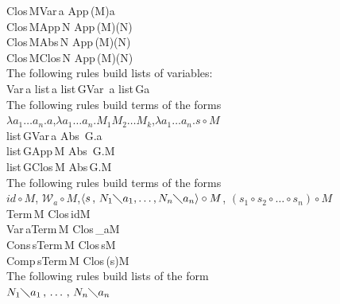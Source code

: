 \documentclass[11pt]{amsart}
\def\ruleone#1#2{\prooftree #1 \justifies #2 \endprooftree}
\def\ruletwo#1#2#3{\ruleone{#1\quad #2}{#3}}
\theoremstyle{plain}
\theoremstyle{definition}
\theoremstyle{remark}
\numberwithin{equation}{section}
\newcommand{\ci}{\circ}
\newcommand{\mi}{\,,\,}
\newcommand{\is}{\diagdown}
\newcommand{\la}{\langle}
\newcommand{\ra}{\rangle}
\newcommand{\term}{Term\,}
\newcommand{\var}{Var\,}
\newcommand{\absterm}{Abs\,}
\newcommand{\appterm}{App\,}
\newcommand{\closterm}{Clos\,}
\newcommand{\compsub}{Comp\,}
\newcommand{\conssub}{Cons\,}
\newcommand{\varlist}{list\,}
\renewcommand{\pi}{\mathcal{W}}
\begin{document}
\ruletwo{\closterm  M}{\var a}{\appterm  (M)a}\\[5pt]

\ruletwo{\closterm  M}{\appterm  N}{\appterm  (M)(N)}\\[5pt]

\ruletwo{\closterm  M}{\absterm  N}{\appterm  (M)(N)}\\[5pt]

\ruletwo{\closterm  M}{\closterm  N}{\appterm  (M)(N)}\\[5pt]


The following rules build lists of variables:\\[5pt]

\ruleone{\var a}{\varlist a}\qquad\ruletwo{\varlist G}{\var
a}{\varlist Ga}\\[5pt]


The following rules build terms of the forms\\[1pt]
$\lambda a_1\ldots a_n.a$,\quad $\lambda a_1\ldots
a_n.M_1M_2\ldots
M_k$,\quad  $\lambda a_1\ldots a_n.s\ci M$\\[5pt]

\ruletwo{\varlist G}{\var a}{\absterm  \lambda
G.a}\\[5pt]

\ruletwo{\varlist  G}{\appterm  M}{\absterm \lambda
G.M}\\[5pt]

\ruletwo{\varlist  G}{\closterm  M}{\absterm  \lambda  G.M}\\[5pt]


The following rules build terms of the forms\\[1pt]
 $id\ci M$,\quad
$\pi_a\ci M$,\quad $\la s\mi N_1\is a_1,\ldots,N_n\is a_n\ra\ci
M$,\quad
 $(s_1\ci s_2\ci\ldots\ci s_n)\ci M$\\[5pt]

\ruleone{\term  M}{\closterm  id\ci M}\\[5pt]

\ruletwo{\var a}{\term  M}{\closterm  \pi_a\ci  M}\\[5pt]

\ruletwo{\conssub  s}{\term  M}{\closterm  s\ci  M}\\[5pt]

\ruletwo{\compsub  s}{\term  M}{\closterm  (s)\ci  M}\\[5pt]


The following rules build lists of the form\\[1pt]
 $N_1\is
a_1\mi\ldots\mi N_n\is a_n$\\[5pt]
\end{document}
